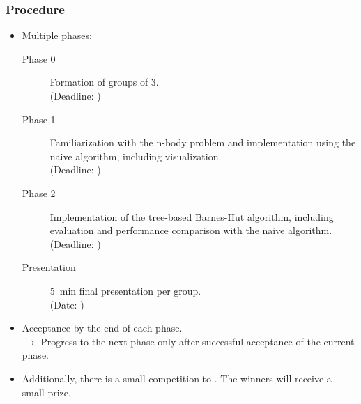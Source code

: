 \begin{frame}
  \frametitle{Procedure}
  \vspace*{-1em}
  \begin{itemize}
    \item Multiple phases:
          \begin{description}
            \item[Phase 0] Formation of groups of 3. \\
            (Deadline: \textbf{\dateDeadlinePhaseZero})
            \item[Phase 1] Familiarization with the n-body problem and implementation using the naive algorithm, including visualization. \\
            (Deadline: \textbf{\dateDeadlinePhaseOne})
            \item[Phase 2] Implementation of the tree-based Barnes-Hut algorithm, including evaluation and performance comparison with the naive algorithm. \\
            (Deadline: \textbf{\dateDeadlinePhaseTwo})
            \item[Presentation] \SI{5}{\minute} final presentation per group. \\
            (Date: \textbf{\dateFinal})
          \end{description}\pause
    \item Acceptance by the end of each phase. \\
          $\rightarrow$ Progress to the next phase only after successful acceptance of the current phase.
    \item Additionally, there is a small competition to . The winners will receive a small prize.
  \end{itemize}
\end{frame}

